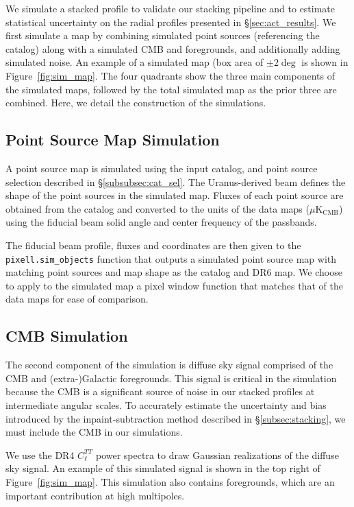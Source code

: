 We simulate a stacked profile to validate our stacking pipeline and to estimate statistical uncertainty on the radial profiles presented in \S\ref{sec:act_results}.  We first simulate a map by combining simulated point sources (referencing the catalog) along with a simulated CMB and foregrounds, and additionally adding simulated noise.  An example of a simulated map (box area of $\pm2\deg$ is shown in Figure~\ref{fig:sim_map}.  The four quadrants show the three main components of the simulated maps, followed by the total simulated map as the prior three are combined.  Here, we detail the construction of the simulations.

\subsection{Point Source Map Simulation}
\label{subsec:sim_ptsrc}
A point source map is simulated using the input catalog, and point source selection described in \S\ref{subsubsec:cat_sel}.  The Uranus-derived beam defines the shape of the point sources in the simulated map.  Fluxes of each point source are obtained from the catalog and converted to the units of the data maps ($\mu \text{K}_\text{CMB}$) using the fiducial beam solid angle and center frequency of the passbands.

The fiducial beam profile, fluxes and coordinates are then given to the \verb|pixell.sim_objects| function that outputs a simulated point source map with matching point sources and map shape as the catalog and DR6 map. We choose to apply to the simulated map a pixel window function that matches that of the data maps for ease of comparison.

\subsection{CMB Simulation}
\label{subsec:sim_cmb}
The second component of the simulation is diffuse sky signal comprised of the CMB and (extra-)Galactic foregrounds.  This signal is critical in the simulation because the CMB is a significant source of noise in our stacked profiles at intermediate angular scales.  To accurately estimate the uncertainty and bias introduced by the inpaint-subtraction method described in \S\ref{subsec:stacking}, we must include the CMB in our simulations.

We use the DR4 $C_\ell^{TT}$ power spectra to draw Gaussian realizations of the diffuse sky signal. An example of this simulated signal is shown in the top right of Figure~\ref{fig:sim_map}.  This simulation also contains foregrounds, which are an important contribution at high multipoles.

